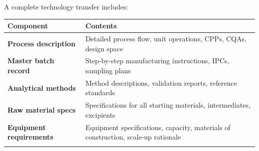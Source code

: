 \documentclass[
  11pt,
  a4paper,
]{report}
\begin{document}
A complete technology transfer includes:

\begin{longtable}[]{@{}ll@{}}
\toprule
\begin{minipage}[b]{0.49\columnwidth}\raggedright
Component\strut
\end{minipage} & \begin{minipage}[b]{0.45\columnwidth}\raggedright
Contents\strut
\end{minipage}\tabularnewline
\midrule
\endhead
\begin{minipage}[t]{0.49\columnwidth}\raggedright
\textbf{Process description}\strut
\end{minipage} & \begin{minipage}[t]{0.45\columnwidth}\raggedright
Detailed process flow, unit operations, CPPs, CQAs, design space\strut
\end{minipage}\tabularnewline
\begin{minipage}[t]{0.49\columnwidth}\raggedright
\textbf{Master batch record}\strut
\end{minipage} & \begin{minipage}[t]{0.45\columnwidth}\raggedright
Step-by-step manufacturing instructions, IPCs, sampling plans\strut
\end{minipage}\tabularnewline
\begin{minipage}[t]{0.49\columnwidth}\raggedright
\textbf{Analytical methods}\strut
\end{minipage} & \begin{minipage}[t]{0.45\columnwidth}\raggedright
Method descriptions, validation reports, reference standards\strut
\end{minipage}\tabularnewline
\begin{minipage}[t]{0.49\columnwidth}\raggedright
\textbf{Raw material specs}\strut
\end{minipage} & \begin{minipage}[t]{0.45\columnwidth}\raggedright
Specifications for all starting materials, intermediates,
excipients\strut
\end{minipage}\tabularnewline
\begin{minipage}[t]{0.49\columnwidth}\raggedright
\textbf{Equipment requirements}\strut
\end{minipage} & \begin{minipage}[t]{0.45\columnwidth}\raggedright
Equipment specifications, capacity, materials of construction, scale-up
rationale\strut
\end{minipage}\tabularnewline
\begin{minipage}[t]{0.49\columnwidth}\raggedright

\end{minipage}
\end{longtable}
\end{document}
